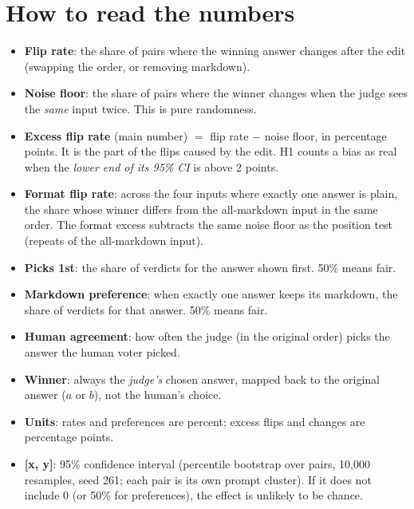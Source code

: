 \documentclass[10.5pt]{article}
\begin{document}
\section{How to read the numbers}
\begin{itemize}
\item \textbf{Flip rate}: the share of pairs where the winning answer changes after the edit (swapping the order,
or removing markdown).
\item \textbf{Noise floor}: the share of pairs where the winner changes when the judge sees the \emph{same} input
twice. This is pure randomness.
\item \textbf{Excess flip rate} (main number) $=$ flip rate $-$ noise floor, in percentage points. It is the part
of the flips caused by the edit. H1 counts a bias as real when the \emph{lower end of its 95\% CI} is above 2 points.
\item \textbf{Format flip rate}: across the four inputs where exactly one answer is plain, the share whose winner
differs from the all-markdown input in the same order. The format excess subtracts the same noise floor as the
position test (repeats of the all-markdown input).
\item \textbf{Picks 1st}: the share of verdicts for the answer shown first. 50\% means fair.
\item \textbf{Markdown preference}: when exactly one answer keeps its markdown, the share of verdicts for that
answer. 50\% means fair.
\item \textbf{Human agreement}: how often the judge (in the original order) picks the answer the human voter picked.
\item \textbf{Winner}: always the \emph{judge's} chosen answer, mapped back to the original answer ($a$ or $b$),
not the human's choice.
\item \textbf{Units}: rates and preferences are percent; excess flips and changes are percentage points.
\item \textbf{[x, y]}: 95\% confidence interval (percentile bootstrap over pairs, 10{,}000 resamples, seed 261;
each pair is its own prompt cluster). If it does not include 0 (or 50\% for
preferences), the effect is unlikely to be chance.
\end{itemize}
\end{document}

